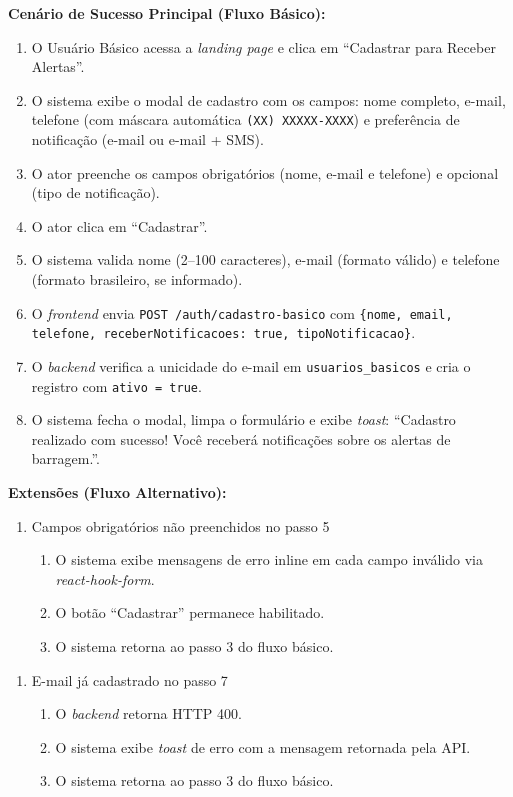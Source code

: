 \textbf{Cenário de Sucesso Principal (Fluxo Básico):}
\begin{enumerate}
  \item O Usuário Básico acessa a \textit{landing page} e
        clica em ``Cadastrar para Receber Alertas''.
  \item O sistema exibe o modal de cadastro com os campos:
        nome completo, e-mail, telefone (com máscara automática
        \texttt{(XX) XXXXX-XXXX}) e preferência de notificação
        (e-mail ou e-mail + SMS).
  \item O ator preenche os campos obrigatórios (nome, e-mail e telefone)
        e opcional (tipo de notificação).
  \item O ator clica em ``Cadastrar''.
  \item O sistema valida nome (2--100 caracteres), e-mail
        (formato válido) e telefone (formato brasileiro,
        se informado).
  \item O \textit{frontend} envia
        \texttt{POST /auth/cadastro-basico} com
        \texttt{\{nome, email, telefone, receberNotificacoes:
        true, tipoNotificacao\}}.
  \item O \textit{backend} verifica a unicidade do e-mail
        em \texttt{usuarios\_basicos} e cria o registro com
        \texttt{ativo = true}.
  \item O sistema fecha o modal, limpa o formulário e exibe
        \textit{toast}: ``Cadastro realizado com sucesso!
        Você receberá notificações sobre os alertas de
        barragem.''.
\end{enumerate}

\textbf{Extensões (Fluxo Alternativo):}

\begin{enumerate}
  \renewcommand{\theenumi}{5a}
  \renewcommand{\labelenumi}{\theenumi.}
  \item Campos obrigatórios não preenchidos no passo 5
  \begin{enumerate}
  \item O sistema exibe mensagens de erro inline em cada
        campo inválido via \textit{react-hook-form}.
  \item O botão ``Cadastrar'' permanece habilitado.
  \item O sistema retorna ao passo 3 do fluxo básico.
  \end{enumerate}
\end{enumerate}

\begin{enumerate}
  \renewcommand{\theenumi}{7a}
  \renewcommand{\labelenumi}{\theenumi.}
  \item E-mail já cadastrado no passo 7
  \begin{enumerate}
  \item O \textit{backend} retorna HTTP 400.
  \item O sistema exibe \textit{toast} de erro com a
        mensagem retornada pela API.
  \item O sistema retorna ao passo 3 do fluxo básico.
  \end{enumerate}
\end{enumerate}

